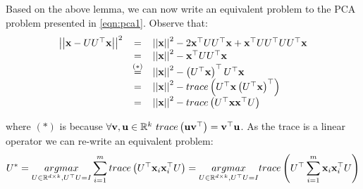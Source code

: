 Based on the above lemma, we can now write an equivalent problem to the PCA problem presented in \ref{eqn:pca1}. Observe that:
$$
\begin{array}{ccl}
\left|\left| \mathbf{x}-UU^\top\mathbf{x}\right|\right|^2 & = & \left|\left| \mathbf{x}\right|\right|^2 -2\mathbf{x}^\top UU^\top\mathbf{x} + \mathbf{x}^\top UU^\top UU^\top\mathbf{x} \\
& = & \left|\left| \mathbf{x}\right|\right|^2 -\mathbf{x}^\top UU^\top\mathbf{x}\\
& \overset{\left(*\right)}{=} & \left|\left| \mathbf{x}\right|\right|^2 -\left(U^\top\mathbf{x}\right)^\top U^\top\mathbf{x}\\
& = & \left|\left| \mathbf{x}\right|\right|^2 - trace\left(U^\top\mathbf{x} \left(U^\top\mathbf{x}\right)^\top\right) \\
& = & \left|\left| \mathbf{x}\right|\right|^2 - trace\left(U^\top\mathbf{x}\mathbf{x}^\top U\right)
\end{array}$$

where $\left(*\right)$ is because $\forall \mathbf{v},\mathbf{u}\in\mathbb{R}^k \,\, trace\left(\mathbf{u}\mathbf{v}^\top\right)=\mathbf{v}^\top\mathbf{u}$. As the trace is a linear operator we can re-write an equivalent problem:
\begin{equation}
U^* = \underset{U\in\mathbb{R}^{d\times k},U^\top U=I}{argmax} \sum_{i=1}^m trace\left(U^\top\mathbf{x}_i\mathbf{x}_i^\top U\right) = \underset{U\in\mathbb{R}^{d\times k},U^\top U=I}{argmax} trace\left(U^\top\sum_{i=1}^m \mathbf{x}_i\mathbf{x}_i^\top U\right)
\label{eqn:pca2}
\end{equation}



